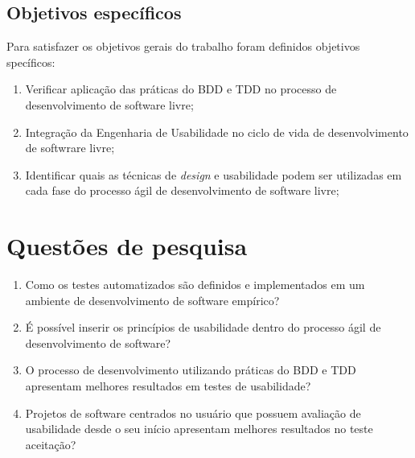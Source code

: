 	 
\subsection{Objetivos específicos}

Para satisfazer os objetivos gerais do trabalho foram definidos objetivos specíficos:

\begin{enumerate}
\item Verificar aplicação das práticas do BDD e TDD no processo de desenvolvimento de software livre;
\item Integração da Engenharia de Usabilidade no ciclo de vida de desenvolvimento de softwrare livre;
\item Identificar quais as técnicas de \emph{design} e usabilidade  podem ser utilizadas em cada fase do processo ágil de desenvolvimento de software livre;



\end{enumerate}

\section{Questões de pesquisa}


\begin{enumerate}
\item Como os testes automatizados são definidos e implementados em um ambiente de desenvolvimento de software empírico?
\item É possível inserir os princípios de usabilidade dentro do processo ágil de desenvolvimento de software?
\item O processo de desenvolvimento utilizando práticas do BDD e TDD apresentam melhores resultados em testes de usabilidade?
\item Projetos de software centrados no usuário que possuem avaliação de usabilidade desde o seu início apresentam melhores resultados no teste aceitação?
\end{enumerate}
	 
